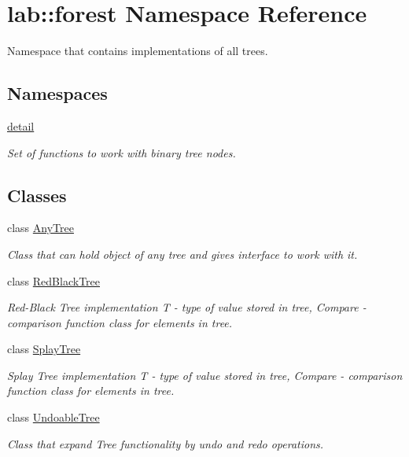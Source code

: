 \hypertarget{namespacelab_1_1forest}{}\section{lab\+:\+:forest Namespace Reference}
\label{namespacelab_1_1forest}


Namespace that contains implementations of all trees.  


\subsection*{Namespaces}
\begin{DoxyCompactItemize}
\item 
 \hyperlink{namespacelab_1_1forest_1_1detail}{detail}
\begin{DoxyCompactList}\small\item\em Set of functions to work with binary tree nodes. \end{DoxyCompactList}\end{DoxyCompactItemize}
\subsection*{Classes}
\begin{DoxyCompactItemize}
\item 
class \hyperlink{classlab_1_1forest_1_1AnyTree}{Any\+Tree}
\begin{DoxyCompactList}\small\item\em Class that can hold object of any tree and gives interface to work with it. \end{DoxyCompactList}\item 
class \hyperlink{classlab_1_1forest_1_1RedBlackTree}{Red\+Black\+Tree}
\begin{DoxyCompactList}\small\item\em Red-\/\+Black Tree implementation T -\/ type of value stored in tree, Compare -\/ comparison function class for elements in tree. \end{DoxyCompactList}\item 
class \hyperlink{classlab_1_1forest_1_1SplayTree}{Splay\+Tree}
\begin{DoxyCompactList}\small\item\em Splay Tree implementation T -\/ type of value stored in tree, Compare -\/ comparison function class for elements in tree. \end{DoxyCompactList}\item 
class \hyperlink{classlab_1_1forest_1_1UndoableTree}{Undoable\+Tree}
\begin{DoxyCompactList}\small\item\em Class that expand Tree functionality by undo and redo operations. \end{DoxyCompactList}\end{DoxyCompactItemize}

